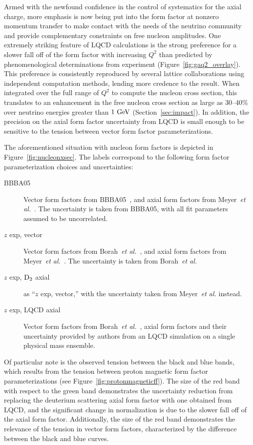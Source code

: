 \documentclass{ar-1col}
\begin{document}
Armed with the newfound confidence in the control of systematics for the axial charge,
 more emphasis is now being put into the form factor at nonzero momentum transfer
to make contact with the needs of the neutrino community and provide
 complementary constraints on free nucleon amplitudes.
One extremely striking feature of LQCD calculations is the strong preference for a slower
fall off of the form factor with increasing $Q^2$ than predicted by phenomenological determinations from experiment (Figure~\ref{fig:gaq2_overlay}).
This preference is consistently reproduced by several lattice collaborations using
independent computation methods, lending more credence to the result.
When integrated over the full range of $Q^2$ to compute the nucleon cross section,
this translates to an enhancement in the free nucleon cross section as large as 30--40\%
over neutrino energies greater than $1~{\rm GeV}$ (Section~\ref{sec:impact}).
In addition, the precision on the axial form factor uncertainty from LQCD
is small enough to be sensitive to the tension between vector form factor parameterizations.

The aforementioned situation with nucleon form factors is depicted in Figure~\ref{fig:nucleonxsec}.
The labels correspond to the following form factor parameterization choices and uncertainties:
\begin{description}
 \item[BBBA05] Vector form factors from BBBA05~\cite{Bradford:2006yz},
 and axial form factors from Meyer~{\it et al.}~\cite{Meyer:2016oeg}.
 The uncertainty is taken from BBBA05, with all fit parameters assumed to be uncorrelated.
 \item[$z$ exp, vector] Vector form factors from Borah~{\it et al.}~\cite{Borah:2020gte},
 and axial form factors from Meyer~{\it et al.}~\cite{Meyer:2016oeg}.
 The uncertainty is taken from Borah~{\it et al.}
 \item[$z$ exp, ${\rm D}_{2}$ axial] as ``$z$ exp, vector,''
 with the uncertainty taken from Meyer~{\it et al.} instead.
 \item[$z$ exp, LQCD axial] Vector form factors from Borah~{\it et al.}~\cite{Borah:2020gte},
 axial form factors and their uncertainty provided by authors from an LQCD simulation
 on a single physical mass ensemble.
\end{description}
Of particular note is the observed tension between the black and blue bands,
 which results from the tension between proton magnetic form factor parameterizations
 (see Figure~\ref{fig:protonmagneticff}).
The size of the red band with respect to the green band demonstrates the uncertainty reduction from replacing the deuterium scattering axial form factor with one obtained from LQCD, and the significant change in normalization is due to the slower fall off of the axial form factor.
Additionally, the size of the red band demonstrates the relevance of the tension in vector form factors, characterized by the difference between the black and blue curves.
\end{document}
